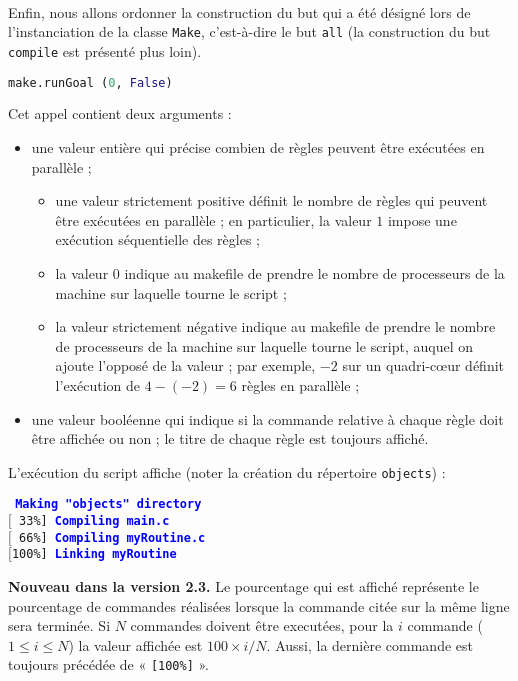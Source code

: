 \documentclass[a4paper,11pt]{extarticle}
\begin{document}
~\\Enfin, nous allons ordonner la construction du but qui a été désigné lors de l'instanciation de la classe \texttt{Make}, c'est-à-dire le but \texttt{all} (la construction du but \texttt{compile} est présenté plus loin).

\begin{lstlisting}[language=py]
make.runGoal (0, False)
\end{lstlisting}


Cet appel contient deux arguments :
\begin{itemize}
\item une valeur entière qui précise combien de règles peuvent être exécutées en parallèle ;
  \begin{itemize}
  \item une valeur strictement positive définit le nombre de règles qui peuvent être exécutées en parallèle ; en particulier, la valeur $1$ impose une exécution séquentielle des règles ;
  \item la valeur $0$ indique au makefile de prendre le nombre de processeurs de la machine sur laquelle tourne le script ;
  \item la valeur strictement négative indique au makefile de prendre le nombre de processeurs de la machine sur laquelle tourne le script, auquel on ajoute l'opposé de la valeur ; par exemple, $-2$ sur un quadri-cœur définit l'exécution de $4-(-2)=6$ règles en parallèle ;
  \end{itemize}
\item une valeur booléenne qui indique si la commande relative à chaque règle doit être affichée ou non ; le titre de chaque règle est toujours affiché.
\end{itemize}

L'exécution du script affiche  (noter la création du répertoire \texttt{objects}) :

\begin{mdframed}[hidealllines=true,backgroundcolor=lightgray!20]
\tt\footnotesize
\textcolor{blue}{\bf Making "objects" directory}\\
$[$~33\%]~\textcolor{blue}{\bf Compiling main.c}\\
$[$~66\%]~\textcolor{blue}{\bf Compiling myRoutine.c}\\
$[$100\%]~\textcolor{blue}{\bf Linking myRoutine}
\end{mdframed}

{\bf Nouveau dans la version 2.3.}\label{affichagePourcentage} Le pourcentage qui est affiché représente le pourcentage de commandes réalisées lorsque la commande citée sur la même ligne sera terminée. Si $N$ commandes doivent être executées, pour la $i$  commande ($1 \leqslant i \leqslant N$) la valeur affichée est $100 \times i / N$. Aussi, la dernière commande est toujours précédée de « \texttt{[100\%]} ».
\end{document}
